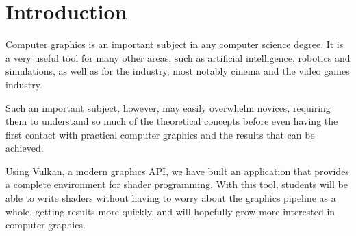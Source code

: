 \chapter{Introduction}
Computer graphics is an important subject in any computer science degree. It is a very useful tool for many other areas, such as artificial intelligence, robotics and simulations, as well as for the industry, most notably cinema and the video games industry.

Such an important subject, however, may easily overwhelm novices, requiring them to understand so much of the theoretical concepts before even having the first contact with practical computer graphics and the results that can be achieved.

Using Vulkan, a modern graphics API, we have built an application that provides a complete environment for shader programming. With this tool, students will be able to write shaders without having to worry about the graphics pipeline as a whole, getting results more quickly, and will hopefully grow more interested in computer graphics.


